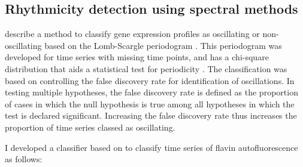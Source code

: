 \subsection{Rhythmicity detection using spectral methods}
\label{subsec:analysis-classification-spectral}



\textcite{glynnDetectingPeriodicPatterns2006} describe a method to classify gene expression profiles as oscillating or non-oscillating based on the Lomb-Scargle periodogram \parencite{lombLeastsquaresFrequencyAnalysis1976}.
This periodogram was developed for time series with missing time points, and has a chi-square distribution that aids a statistical test for periodicity \parencite{scargleStudiesAstronomicalTime1982}.
The classification was based on controlling the false discovery rate for identification of oscillations.
In testing multiple hypotheses, the false discovery rate is defined as the proportion of cases in which the null hypothesis is true among all hypotheses in which the test is declared significant.
Increasing the false discovery rate thus increases the proportion of time series classed as oscillating.

I developed a classifier based on \textcite{glynnDetectingPeriodicPatterns2006} to classify time series of flavin autofluorescence as follows:

